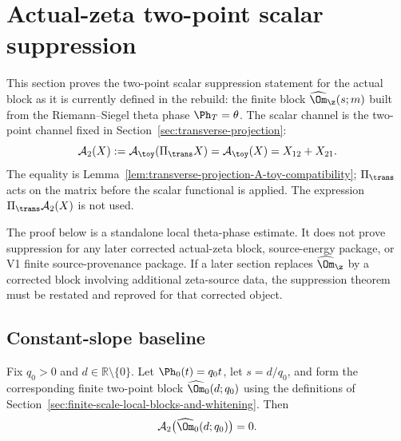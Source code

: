 \section{Actual-zeta two-point scalar suppression}
\label{sec:actual-zeta-transverse-suppression}
\quad
{}\quad
{}\quad
{}\quad
{}\quad
{}
\par\medskip

This section proves the two-point scalar suppression statement for the
actual block as it is currently defined in the rebuild: the finite block
\(\widehat\Om_\z(s;m)\) built from the Riemann--Siegel theta phase
\(\Ph_T=\theta\).  The scalar channel is the two-point channel fixed in
Section~\ref{sec:transverse-projection}:
\begin{equation}
\label{eq:A2-actual-zeta-scalar-channel}
        \mathcal A_2(X)
        :=\mathcal A_\toy(\Pi_\trans X)
        =\mathcal A_\toy(X)
        =X_{12}+X_{21}.
\end{equation}
The equality is Lemma~\ref{lem:transverse-projection-A-toy-compatibility};
\(\Pi_\trans\) acts on the matrix before the scalar functional is applied.
The expression \(\Pi_\trans\mathcal A_2(X)\) is not used.

\begin{remark}
\label{rem:theta-suppression-scope}
The proof below is a standalone local theta-phase estimate.  It does not
prove suppression for any later corrected actual-zeta block, source-energy
package, or V1 finite source-provenance package.  If a later section
replaces \(\widehat\Om_\z\) by a corrected block involving additional
zeta-source data, the suppression theorem must be restated and reproved for
that corrected object.
\end{remark}

\subsection{Constant-slope baseline}
\label{subsec:constant-slope-baseline}

\begin{lemma}
\label{lem:constant-slope-scalar-cancellation}
Fix \(q_0>0\) and \(d\in\mathbb R\setminus\{0\}\).  Let \(\Ph_0(t)=q_0t\),
let \(s=d/q_0\), and form the corresponding finite two-point block
\(\widehat\Om_0(d;q_0)\) using the definitions of
Section~\ref{sec:finite-scale-local-blocks-and-whitening}.  Then
\begin{equation}
\label{eq:constant-slope-A2-zero}
        \mathcal A_2\bigl(\widehat\Om_0(d;q_0)\bigr)=0.
\end{equation}
\end{lemma}

